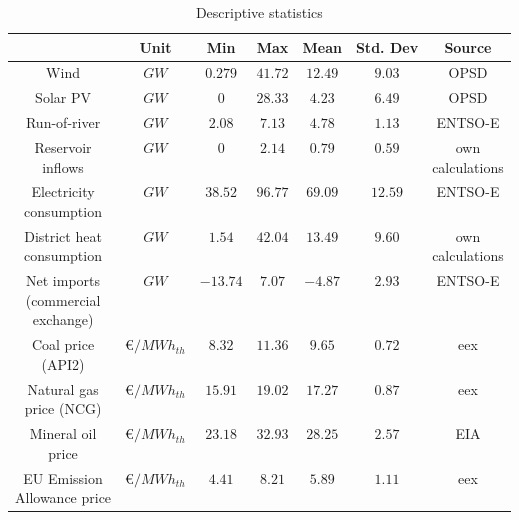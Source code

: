 \documentclass[11pt,a4paper]{article}
\begin{document}
\begin{table}[t!]
\caption{Descriptive statistics}
\smallskip
\centering
\begin{tabular}{c c c c c c c}
\hline
 & Unit & Min & Max & Mean & Std. Dev & Source \\ \hline \hline
Wind & $GW$ & $0.279$ & $41.72$ & $12.49$ & $9.03$ & OPSD \\ \hline
Solar PV & $GW$ & $0$ & $28.33$ & $4.23$ & $6.49$ & OPSD \\ \hline
Run-of-river & $GW$ & $2.08$ & $7.13$ & $4.78$ & $1.13$ & ENTSO-E \\ \hline
\makecell{Reservoir \\ inflows} & $GW$ & $0$ & $2.14$ & $0.79$ & $0.59$ & \makecell{own\\ calculations} \\ \hline
\makecell{Electricity \\consumption} & $GW$ & $38.52$ & $96.77$ & $69.09$ & $12.59$ & ENTSO-E \\ \hline
\makecell{District heat \\ consumption} & $GW$ & $1.54$ & $42.04$ & $13.49$ & $9.60$ & \makecell{own \\calculations} \\ \hline
\makecell{Net imports \\ (commercial \\exchange)} & $GW$ & $-13.74$ & $7.07$ & $-4.87$ & $2.93$ & ENTSO-E\\ \hline
\makecell{Coal price \\(API2)} & \euro{}$/MWh_{th}$ & $8.32$ & $11.36$ & $9.65$ & $0.72$ & eex \\ \hline
\makecell{Natural gas \\price (NCG)} & \euro{}$/MWh_{th}$ & $15.91$ & $19.02$ & $17.27$ & $0.87$ & eex\\ \hline
\makecell{Mineral oil \\price} & \euro{}$/MWh_{th}$ & $23.18$ & $32.93$ & $28.25$ & $2.57$ & EIA\\ \hline
\makecell{EU Emission \\Allowance price} & \euro{}$/MWh_{th}$ & $4.41$ & $8.21$ & $5.89$ & $1.11$ & eex\\
\hline \hline
\end{tabular}
\label{Tab2}
\end{table}
\end{document}
